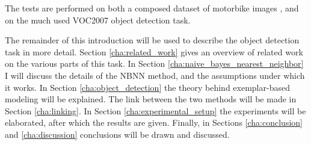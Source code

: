 The tests are performed on both a composed dataset of motorbike images \cite{becker2012codebook}, and on the much used VOC2007 object detection task. \cite{pascal-voc-2007}


The remainder of this introduction will be used to describe the object detection task in more detail. Section \ref{cha:related_work} gives an overview of related work on the various parts of this task. In Section \ref{cha:naive_bayes_nearest_neighbor} I will discuss the details of the NBNN method, and the assumptions under which it works. In Section \ref{cha:object_detection} the theory behind exemplar-based modeling will be explained. The link between the two methods will be made in Section \ref{cha:linking}. In Section \ref{cha:experimental_setup} the experiments will be elaborated, after which the results are given. Finally, in Sections \ref{cha:conclusion} and \ref{cha:discussion} conclusions will be drawn and discussed.

